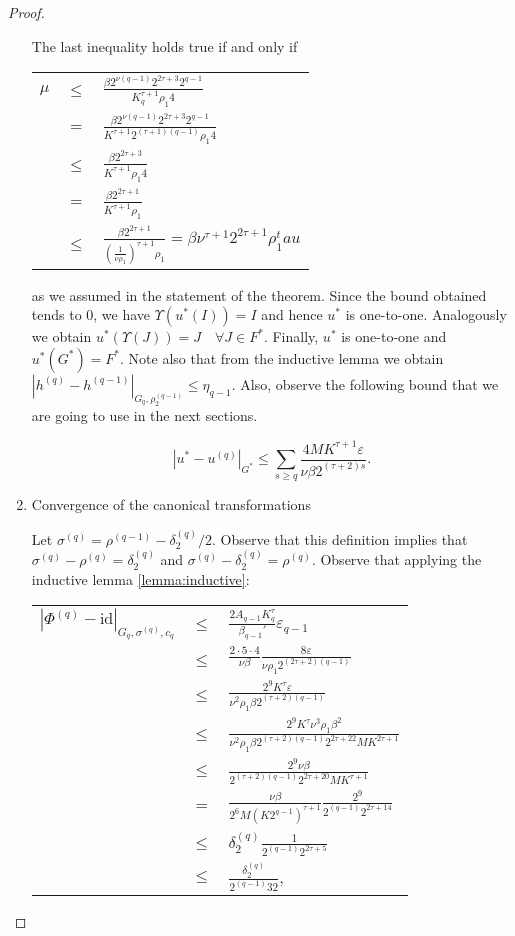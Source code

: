 \begin{proof}
\begin{enumerate}
The last inequality holds true if and only if


\begin{longtable}{rcl}
$\mu$ & $\leq$ & $\frac{\beta 2^{\nu(q-1)}2^{2\tau+3}2^{q-1}}{K_q^{\tau+1}\rho_1 4}$ \\
& $=$ & $\frac{\beta 2^{\nu(q-1)}2^{2\tau+3}2^{q-1}}{K^{\tau+1} 2^{(\tau+1)(q-1)}\rho_1 4}$ \\
& $\leq$ & $\frac{\beta 2^{2\tau+3}}{K^{\tau+1}\rho_1 4}$ \\
& $=$ & $\frac{\beta 2^{2\tau+1}}{K^{\tau+1}\rho_1}$ \\
& $\leq$ & $\frac{\beta 2^{2\tau+1}}{(\frac{1}{\nu \rho_1})^{\tau+1}\rho_1} = \beta \nu^{\tau+1}2^{2\tau+1}\rho_1^tau$ \\
\end{longtable}

as we assumed in the statement of the theorem.
Since the bound obtained tends to 0, we have $\Upsilon(u^*(I)) = I$ and hence $u^*$ is one-to-one. Analogously we obtain $u^*(\Upsilon(J)) = J \quad \forall J \in F^*$. Finally, $u^*$ is one-to-one and $u^*(G^* ) = F^*$. Note also that from the inductive lemma we obtain $|h^{(q)}-h^{(q-1)}|_{G_q,\rho_2^{(q-1)}}\leq \eta_{q-1}$.
Also, observe the following bound that we are going to use in the next sections.

$$|u^* - u^{(q)}|_{G^*} \leq \sum_{s\geq q} \frac{4 M K^{\tau+1}\varepsilon}{\nu\beta 2^{(\tau+2)s}}.$$

\item Convergence of the canonical transformations

Let $\sigma^{(q)} = \rho^{(q-1)} - \delta_2^{(q)}/2$. Observe that this definition implies that $\sigma^{(q)} - \rho^{(q)} = \delta_2^{(q)}$ and $\sigma^{(q)} - \delta_2^{(q)} =  \rho^{(q)}$.
Observe that applying the inductive lemma \ref{lemma:inductive}:

\begin{longtable}{rcl}\label{eq:conv_can_trans}
$|\Phi^{(q)} - \text{id}|_{G_q,\sigma^{(q)}, c_q}$ & $\leq $ & $\frac{2A_{q-1} K_q^{\tau}}{\beta_{q-1}'}\varepsilon_{q-1}$ \\
& $\leq$ & $\frac{2\cdot 5 \cdot 4}{\nu\beta}\frac{8\varepsilon}{\nu\rho_1 2^{(2\tau+2)(q-1)}}$ \\
& $\leq$ & $\frac{2^9 K^\tau \varepsilon}{\nu^2 \rho_1 \beta 2^{(\tau+2)(q-1)}}$ \\
& $\leq$ & $\frac{2^9 K^\tau \nu^3 \rho_1 \beta^2}{\nu^2 \rho_1 \beta 2^{(\tau+2)(q-1)}2^{2\tau+22}M K^{2\tau+1}}$ \\
& $\leq$ & $\frac{2^9 \nu \beta}{2^{(\tau+2)(q-1)}2^{2\tau+20} M K^{\tau+1}}$ \\
& $=$ & $\frac{\nu\beta}{2^6 M (K 2^{q-1})^{\tau+1}}\frac{2^9}{2^{(q-1)}2^{2\tau+14}}$ \\
& $\leq$ & $\delta_2^{(q)}\frac{1}{2^{(q-1)} 2^{2\tau+5}}$ \\
& $\leq$ & $\frac{\delta_2^{(q)}}{2^{(q-1)} 32},$ \\
\end{longtable}


\end{enumerate}
\end{proof}
